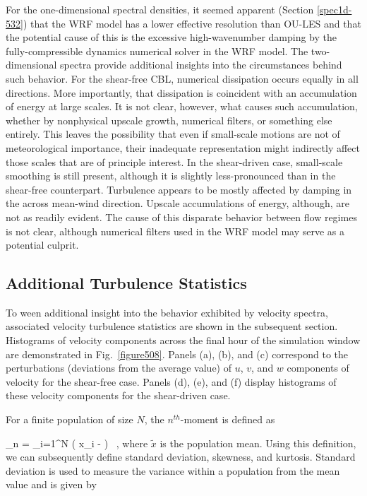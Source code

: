 For the one-dimensional spectral densities, it seemed apparent (Section \autoref{spec1d-532}) that the WRF model has a lower effective resolution than OU-LES and that the potential cause of this is the excessive high-wavenumber damping by the fully-compressible dynamics numerical solver in the WRF model. The two-dimensional spectra provide additional insights into the circumstances behind such behavior. For the shear-free CBL, numerical dissipation occurs equally in all directions. More importantly, that dissipation is coincident with an accumulation of energy at large scales. It is not clear, however, what causes such accumulation, whether by nonphysical upscale growth, numerical filters, or something else entirely. This leaves the possibility that even if small-scale motions are not of meteorological importance, their inadequate representation might indirectly affect those scales that are of principle interest. In the shear-driven case, small-scale smoothing is still present, although it is slightly less-pronounced than in the shear-free counterpart. Turbulence appears to be mostly affected by damping in the across mean-wind direction. Upscale accumulations of energy, although, are not as readily evident. The cause of this disparate behavior between flow regimes is not clear, although numerical filters used in the WRF model may serve as a potential culprit.

\subsection{Additional Turbulence Statistics}
\label{turb-stats-534}

To ween additional insight into the behavior exhibited by velocity spectra, associated velocity turbulence statistics are shown in the subsequent section. Histograms of velocity components across the final hour of the simulation window are demonstrated in Fig.~\ref{figure508}. Panels (a), (b), and (c) correspond to the perturbations (deviations from the average value) of $u$, $v$, and $w$ components of velocity for the shear-free case. Panels (d), (e), and (f) display histograms of these velocity components for the shear-driven case.

For a finite population of size $N$, the $n^{th}$-moment is defined as


\be
\mu_n =  \sum_{i=1}^{N} \left( x_i -  \right)  \mbox{ ,}
\label{moment}
\ee
\noindent where $\widetilde{x}$ is the population mean. Using this definition, we can subsequently define standard deviation, skewness, and kurtosis. Standard deviation is used to measure the variance within a population from the mean value and is given by


